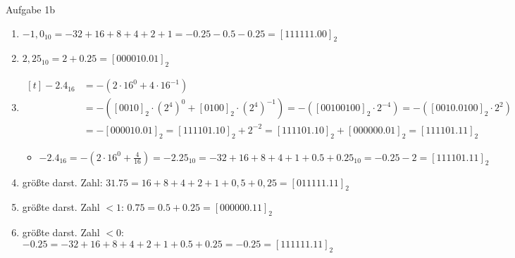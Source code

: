 \begin{frame}{Aufgabe 1b}

  \begin{solutionnoinc}
\begin{enumerate}
  \item $-1,0_{10} = -32+16+8+4+2+1 = -0.25 - 0.5 - 0.25 = [111111.00]_2$
  \item $2,25_{10} = 2+0.25 = [000010.01]_2$
        \item $\begin{aligned}[t]
        -2.4_{16} &= -(2 \cdot 16^0 + 4 \cdot 16^{-1}) \\
		  &= -([0010]_2 \cdot (2^4)^0 + [0100]_2 \cdot (2^4)^{-1}) = -([00100100]_2 \cdot 2^{-4}) = -([0010.0100]_2 \cdot 2^{2}) \\
		  &= -[000010.01]_2 = [111101.10]_2 + 2^{-2} = [111101.10]_2 + [000000.01]_2 = [111101.11]_2
        \end{aligned}$
        \begin{itemize}
          \item $-2.4_{16}= -(2 \cdot 16^{0} + \frac{4}{16}) = -2.25_{10}=-32+16+8+4+1+0.5+0.25_{10} = -0.25 - 2 =[111101.11]_2$
        \end{itemize}
        \item größte darst. Zahl: $31.75 = 16+8+4+2+1+0,5+0,25 = [011111.11]_2$
        \item größte darst. Zahl $ < 1$: $0.75 = 0.5 + 0.25 = [000000.11]_2$
        \item größte darst. Zahl $ < 0$: $-0.25 = -32 + 16 + 8 + 4 + 2 + 1 + 0.5 + 0.25 = -0.25 =  [111111.11]_2$
    \end{enumerate}
  \end{solutionnoinc}



\end{frame}
